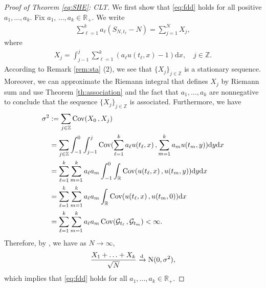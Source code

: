 \documentclass[12pt, reqno]{amsart}
\newcommand{\R}{{\mathbb{R}}}
\newcommand{\Z}{{\mathbb{Z}}}
\renewcommand{\d}{\mathrm{d}}
\newcommand{\<}{\langle}
\renewcommand{\>}{\rangle}
\DeclareMathOperator{\Cov}{\text{\rm Cov}}
\begin{document}
\begin{proof}[Proof of Theorem \ref{eq:SHE}: CLT]
           We first show that \eqref{eq:fdd} holds for all positive $a_1, \ldots, a_k$. Fix $a_1$, $\ldots, a_k\in \R_+$.
            We write
           \begin{align*}
           \sum_{\ell=1}^k a_\ell (S_{N, t_\ell}-N)= \sum_{j=1}^NX_j,
           \end{align*}
           where
           \begin{align*}
           X_j= \int_{j-1}^j \sum_{\ell=1}^k (a_\ell u(t_\ell,x)-1) \d x, \quad j\in \Z.
           \end{align*}
           According to Remark \ref{rem:sta} (2), we see that 
$\{X_j\}_{j\in \Z}$ is a stationary sequence. 
           Moreover, we can approximate the Riemann integral that defines $X_j$ by Riemann sum and use 
           Theorem \ref{th:association} and the fact that 
$a_1, \ldots, a_k$ are nonnegative to conclude that
           the sequence $\{X_j\}_{j\in \Z}$ is associated. Furthermore, we have
           \begin{align*}
           \sigma^2&:=\sum_{j\in \Z} \Cov(X_0\,, X_j)\\
           &= \sum_{j\in \Z} \int_{-1}^0\int_{j-1}^j  
           \Cov(\sum_{\ell=1}^ka_\ell u(t_\ell, x)\,, \sum_{m=1}^ka_m u(t_m, y))\d y\d x\\
           &=\sum_{\ell=1}^k \sum_{m=1}^ka_\ell a_m \int_{-1}^0\int_\R
           \Cov( u(t_\ell, x)\,,  u(t_m, y))\d y\d x\\
           &=\sum_{\ell=1}^k \sum_{m=1}^ka_\ell a_m\int_\R
           \Cov( u(t_\ell, x)\,, u(t_m, 0))\d x\\
           &=\sum_{\ell=1}^k \sum_{m=1}^ka_\ell a_m \Cov(\mathcal{G}_{t_\ell}\,, \mathcal{G}_{t_m})<\infty. 
           \end{align*}
           Therefore, by \cite[Theorem 2]{New80}, we have as $N\to\infty$, 
           \begin{align*}
           \frac{X_1+\ldots +X_k}{\sqrt{N}} \xrightarrow{\rm d} {\rm N}(0, \sigma^2), 
           \end{align*}
           which implies that \eqref{eq:fdd} holds for all $a_1, \ldots, a_k\in \R_+$.
           

\end{proof}
\end{document}
